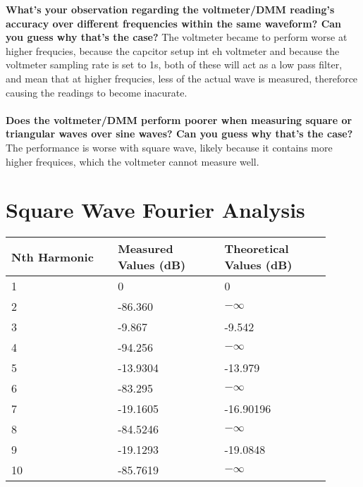 \documentclass[12pt]{article}
\begin{document}
\textbf{What's  your  observation  regarding  the  voltmeter/DMM  reading’s  accuracy  over  different 
frequencies within the same waveform? Can you guess why that's the case? }
The voltmeter became to perform worse at higher frequcies, because the capcitor setup int eh voltmeter and because the voltmeter sampling rate is set to 1s, both of these will act as a low pass filter, and mean that at higher frequcies, less of the actual wave is measured, thereforce causing the readings to become inacurate.
\\\\
\textbf{Does the voltmeter/DMM perform poorer when measuring square or triangular waves over sine 
waves? Can you guess why that's the case? }
The performance is worse with square wave, likely because 
it contains more higher frequices, which the voltmeter cannot measure well.
\section*{Square Wave Fourier Analysis}
\begin{center}
    \begin{tabular}{|p{0.3\linewidth} | p{0.3\linewidth} |p{0.3\linewidth} |} 
     \hline
     Nth Harmonic & Measured Values (dB) & Theoretical Values (dB)\\ [0.5ex] 
     \hline\hline
     1 & 0 & 0\\
     \hline
     2 & -86.360 & $-\infty$\\
     \hline
     3 & -9.867 & -9.542\\
     \hline
     4 & -94.256 & $-\infty$\\
     \hline
     5 & -13.9304 & -13.979\\
     \hline
     6 & -83.295 & $-\infty$\\
     \hline
     7 & -19.1605 & -16.90196\\
     \hline
     8 & -84.5246 & $-\infty$\\
     \hline
     9 & -19.1293 & -19.0848\\
     \hline
     10 & -85.7619 & $-\infty$\\
     \hline
    \end{tabular}
\end{center}
\end{document}
